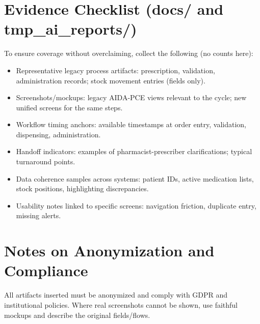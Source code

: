 \section{Evidence Checklist (docs/ and tmp\_ai\_reports/)}
To ensure coverage without overclaiming, collect the following (no counts here):
\begin{itemize}
    \item Representative legacy process artifacts: prescription, validation, administration records; stock movement entries (fields only).
    \item Screenshots/mockups: legacy AIDA-PCE views relevant to the cycle; new unified screens for the same steps.
    \item Workflow timing anchors: available timestamps at order entry, validation, dispensing, administration.
    \item Handoff indicators: examples of pharmacist-prescriber clarifications; typical turnaround points.
    \item Data coherence samples across systems: patient IDs, active medication lists, stock positions, highlighting discrepancies.
    \item Usability notes linked to specific screens: navigation friction, duplicate entry, missing alerts.
\end{itemize}

\section{Notes on Anonymization and Compliance}
All artifacts inserted must be anonymized and comply with GDPR and institutional policies. Where real screenshots cannot be shown, use faithful mockups and describe the original fields/flows.

